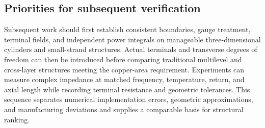 \hypertarget{11.recommendations.heading}{}
\subsection{Priorities for subsequent verification}

\hypertarget{11.recommendations.p1}{}
Subsequent work should first establish consistent boundaries, gauge treatment, terminal fields, and independent power integrals on manageable three-dimensional cylinders and small-strand structures. Actual terminals and transverse degrees of freedom can then be introduced before comparing traditional multilevel and cross-layer structures meeting the copper-area requirement. Experiments can measure complex impedance at matched frequency, temperature, return, and axial length while recording terminal resistance and geometric tolerances. This sequence separates numerical implementation errors, geometric approximations, and manufacturing deviations and supplies a comparable basis for structural ranking.

